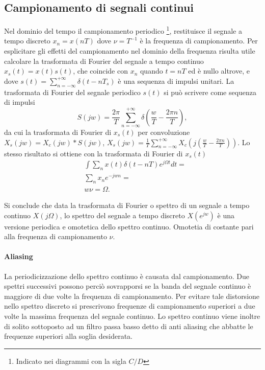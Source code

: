 \subsection{Campionamento di segnali continui}

Nel dominio del tempo il campionamento periodico
\footnote{Indicato nei diagrammi con la sigla $C/D$},
restituisce il segnale a tempo discreto $x_{n} = x(nT)$ dove $\nu = T^{-1}$ è la frequenza di campionamento. Per esplicitare gli effetti del campionamento nel dominio della frequenza risulta utile calcolare la trasformata di Fourier del segnale a tempo continuo
$ x_{s}(t) = x(t)s(t) $, che coincide con $x_{n}$ quando $t=nT$ ed è nullo altrove, e dove
$ s(t) = \sum_{n=-\infty}^{+\infty} \delta(t-nT_{s})$ è una sequenza di impulsi unitari. La trasformata di Fourier del segnale periodico $s(t)$ si può scrivere come sequenza di impulsi
\begin{equation}
S(jw) = \frac{2\pi}{T}\sum_{n=-\infty}^{+\infty} \delta(\frac{w}{T}-\frac{2\pi n}{T} ),
\end{equation}
da cui la trasformata di Fourier di $x_{s}(t)$ per convoluzione
$X_{s}(jw) = X_{c}(jw)*S(jw)$,
$X_{s}(jw) = \frac{1}{T} \sum_{n=-\infty}^{+\infty} X_{c}(j(\frac{w}{T}-\frac{2\pi n}{T}))$.
Lo stesso risultato si ottiene con la trasformata di Fourier di $x_{s}(t)$
\begin{align}
 & \int \sum_{n} x(t)\delta(t-nT)e^{j\Omega t} dt = \\
 & \sum_{n} x_{n} e^{-jw n} = \\
 & w \nu = \Omega.
\end{align}

Si conclude che data la trasformata di Fourier o spettro di un segnale a tempo continuo $X(j\Omega)$, lo spettro del segnale a tempo discreto $ X(e^{jw}) $ è una versione periodica e omotetica dello spettro continuo. Omotetia di costante pari alla frequenza di campionamento $\nu$.

\paragraph{Aliasing}
La periodicizzazione dello spettro continuo è causata dal campionamento. Due spettri successivi possono perciò sovrapporsi se la banda del segnale continuo è maggiore di due volte la frequenza di campionamento. Per evitare tale distorsione nello spettro discreto si prescrivono frequenze di campionamento superiori a due volte la massima frequenza del segnale continuo. Lo spettro continuo viene inoltre di solito sottoposto ad un filtro passa basso detto di anti aliasing che abbatte le frequenze superiori alla soglia desiderata.



